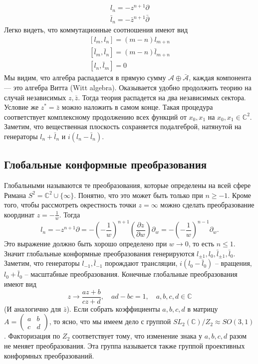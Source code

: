 \documentclass[a4paper,12pt]{article} \usepackage[utf8x]{inputenc} \usepackage[russian]{babel}
\theoremstyle{definition} \newtheorem{corollary}{Corollary}[theorem] \theoremstyle{definition}
\begin{document}
\begin{eqnarray}
  \label{eq:229} l_{n}=-z^{n+1}\partial\\ \bar l_{n}=-\bar z^{n+1}\bar \partial
\end{eqnarray} Легко видеть, что коммутационные соотношения имеют вид
\begin{eqnarray}
  \label{eq:230} \left[l_{m},l_{n}\right]=(m-n) l_{m+n}\\ \left[\bar l_{m},\bar l_{n}\right]=(m-n)
\bar l_{m+n}\\ \left[l_{n},\bar l_{m}\right]=0
\end{eqnarray} Мы видим, что алгебра распадается в прямую сумму $\mathcal{A} \oplus
\bar{\mathcal{A}}$, каждая компонента --- это алгебра Витта (Witt algebra). Оказывается удобно
продолжить теорию на случай независимых $z,\bar z$. Тогда теория распадется на два независимых
сектора. Условие же $z^{*}=\bar z$ можно наложить в самом конце. Такая процедура соответствует
комплексному продолжению всех функций от $x_{0},x_{1}$ на $x_{0},x_{1}\in \mathbb{C}^{2}$. Заметим,
что вещественная плоскость сохраняется подалгеброй, натянутой на генераторы $l_{n}+\bar l_{n}$ и
$i(l_{n}-\bar l_{n})$.

\subsection{Глобальные конформные преобразования}
\label{sec:global-conformal}

Глобальными называются те преобразования, которые определены на всей сфере Римана
$S^{2}=\mathbb{C}^{2}\cup \{\infty\}$. Понятно, что это может быть только при $n\geq -1$. Кроме
того, чтобы рассмотреть окрестность точки $z=\infty$ можно сделать преобразование координат
$z=-\frac{1}{w}$. Тогда
\begin{equation}
  \label{eq:231} l_{n}=-z^{n+1}\partial = - \left(-\frac{1}{w}\right)^{n+1}\left(\frac{\partial
z}{\partial w}\right) \partial_{w}=-\left(-\frac{1}{w}\right)^{n-1}\partial_{w}.
\end{equation} Это выражение должно быть хорошо определено при $w\to 0$, то есть $n\leq 1$. Значит
глобальные конформные преобразования генерируются $l_{\pm 1},l_{0},\bar l_{\pm 1},\bar l_{0}$.
Заметим, что генераторы $l_{-1},\bar l_{-1}$ порождают трансляции, $i(l_{0}-\bar l_{0})$ --
вращения, $l_{0}+\bar l_{0}$ -- масштабные преобразования. Конечные глобальные преобразования имеют
вид
\begin{equation}
  \label{eq:232} z\to \frac{az+b}{cz+d}, \quad ad-bc=1,\quad a,b,c,d\in \mathbb{C}
\end{equation} (И аналогично для $\bar z$). Если собрать коэффициенты $a,b,c,d$ в матрицу $A=
\begin{pmatrix} a & b\\ c & d
\end{pmatrix}$, то ясно, что мы имеем дело с группой $SL_{2}(\mathbb{C})/Z_{2}\approx SO(3,1)$.
Факторизация по $Z_{2}$ соответствует тому, что изменение знака у $a,b,c,d$ разом не меняет
преобразования. Эта группа называется также группой проективных конформных преобразований.
\end{document}
